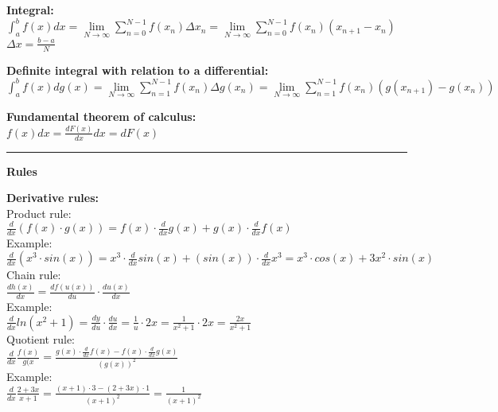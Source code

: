 \documentclass[12pt,a4paper]{report}
\begin{document}
	\textbf{Integral:}\\
	$\int_{a}^{b} f(x) dx = \lim\limits_{N \to \infty} \sum_{n = 0}^{N - 1} f(x_n) \Delta x_n = \lim\limits_{N \to \infty} \sum_{n = 0}^{N - 1} f(x_n)(x_{n+1} - x_n)$\\
	$\Delta x = \frac{b - a}{N}$
	
	\textbf{Definite integral with relation to a differential:}\\
	$\int_{a}^{b} f(x)dg(x) = \lim\limits_{N \to \infty} \sum_{n = 1}^{N - 1} f(x_n)\Delta g(x_n) = \lim\limits_{N \to \infty} \sum_{n = 1}^{N - 1} f(x_n)(g(x_{n+1}) - g(x_n))$
	
	\textbf{Fundamental theorem of calculus:}\\
	$f(x)dx = \frac{dF(x)}{dx}dx = dF(x)$

	\rule{17cm}{1pt}

	\begin{center}\textbf{Rules}\end{center}
	
	\textbf{Derivative rules:}\\
	Product rule:\\
	$\frac{d}{dx}(f(x) \cdot g(x)) = f(x) \cdot \frac{d}{dx}g(x) + g(x) \cdot \frac{d}{dx}f(x)$\\
	Example:\\
	$\frac{d}{dx}(x^3 \cdot sin(x)) = x^3 \cdot \frac{d}{dx} sin(x) + (sin (x)) \cdot \frac{d}{dx} x^3 = x^3 \cdot cos(x) + 3x^2 \cdot sin(x)$\\
	Chain rule:\\
	$\frac{dh(x)}{dx} = \frac{df(u(x))}{du} \cdot \frac{du(x)}{dx}$\\
	Example:\\
	$\frac{d}{dx} ln(x^2 + 1) = \frac{dy}{du} \cdot \frac{du}{dx} = \frac{1}{u} \cdot 2x = \frac{1}{x^2 +1} \cdot 2x = \frac{2x}{x^2 + 1}$\\
	Quotient rule:\\
	$\frac{d}{dx}\frac{f(x)}{g(x} = \frac{g(x) \cdot \frac{d}{dx} f(x) - f(x) \cdot \frac{d}{dx}g(x)}{(g(x))^2}$\\
	Example:\\
	$\frac{d}{dx}\frac{2+3x}{x+1} = \frac{(x+1)\cdot3-(2+3x)\cdot1}{(x+1)^2} = \frac{1}{(x+1)^2}$\\
	
\end{document}
